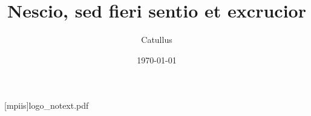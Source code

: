 \documentclass{beamer}
\title{Nescio, sed fieri sentio et excrucior}
\date{\today}
\author[]{Catullus}
\begin{document}
[mpiis]{logo_notext.pdf}
\begin{frame}
\titlepage
\end{frame}
\end{document}
